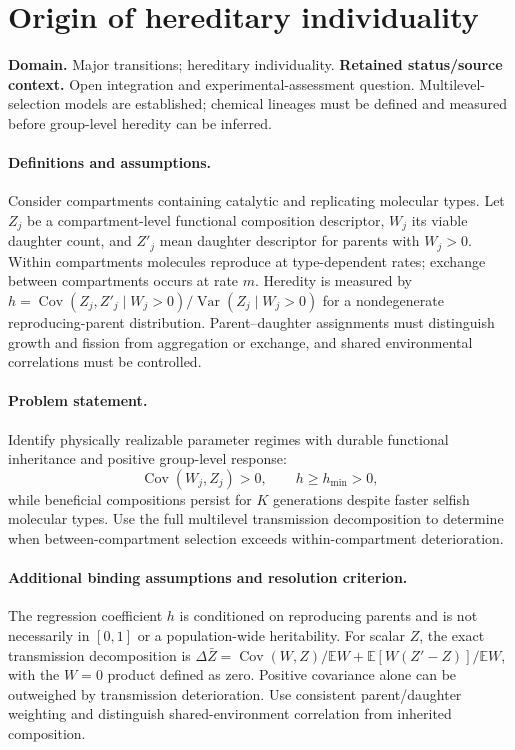 \documentclass[11pt]{article}
\begin{document}
\section*{Origin of hereditary individuality}
\label{prob:296}
\label{rank:314}
\par\smallskip

\noindent\textbf{Domain.} Major transitions; hereditary individuality. \quad \textbf{Retained status/source context.} Open integration and experimental-assessment question. Multilevel-selection models are established; chemical lineages must be defined and measured before group-level heredity can be inferred.

\paragraph{Definitions and assumptions.} Consider compartments containing catalytic and replicating molecular types. Let $Z_j$ be a compartment-level functional composition descriptor, $W_j$ its viable daughter count, and $Z'_j$ mean daughter descriptor for parents with $W_j>0$. Within compartments molecules reproduce at type-dependent rates; exchange between compartments occurs at rate $m$. Heredity is measured by $h=\operatorname{Cov}(Z_j,Z'_j\mid W_j>0)/\operatorname{Var}(Z_j\mid W_j>0)$ for a nondegenerate reproducing-parent distribution. Parent--daughter assignments must distinguish growth and fission from aggregation or exchange, and shared environmental correlations must be controlled.

\paragraph{Problem statement.} Identify physically realizable parameter regimes with durable functional inheritance and positive group-level response:
\[
\operatorname{Cov}(W_j,Z_j)>0,\qquad h\geq h_{\min}>0,
\]
while beneficial compositions persist for $K$ generations despite faster selfish molecular types. Use the full multilevel transmission decomposition to determine when between-compartment selection exceeds within-compartment deterioration.

\paragraph{Additional binding assumptions and resolution criterion.} The regression coefficient $h$ is conditioned on reproducing parents and is not necessarily in $[0,1]$ or a population-wide heritability. For scalar $Z$, the exact transmission decomposition is $\Delta\bar Z=\operatorname{Cov}(W,Z)/\mathbb{E} W+\mathbb{E}[W(Z'-Z)]/\mathbb{E} W$, with the $W=0$ product defined as zero. Positive covariance alone can be outweighed by transmission deterioration. Use consistent parent/daughter weighting and distinguish shared-environment correlation from inherited composition.
\end{document}
